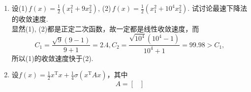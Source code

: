 \begin{enumerate}
\[\begin{array}{cc}
\begin{matrix}
        \end{matrix}
    \end{array}\right)\]
    牛顿法：由最速下降法知：$G$是正定的，且$\displaystyle G^{-1}=\left(\begin{array}{cc}
        \begin{matrix}
            0.5 & 0.5 \\ 0.5 & 1.5
        \end{matrix}
    \end{array}\right)$.\\
    迭代：$x^{(1)}=x^{(0)}-G(x^{(0)})^{-1} \nabla f(x^{(0)})=(1,1)^\mathrm{T}$,\\
    计算得：$\nabla f(x^{(1)})=(0,0)^\mathrm{T}$. 由最优性条件可知，迭代终止，得最优解：$x^*=x^{(1)}=(0,0)^\mathrm{T}$.\\
    若均各迭代一步，牛顿法选用带步长因子的，则解答如下：\\
    将$f(x)$写成$\displaystyle f(x) = \frac{1}{2}x^{\mathrm{T}}Gx-b^{\mathrm{T}}x$的形式，有
        \[G=\begin{pmatrix}
            3 & -1\\-1 & 1
        \end{pmatrix},b = \begin{pmatrix}
            2\\0
        \end{pmatrix}\]
        最速下降法：设$x^{(0)}=(-2,4)^{\mathrm{T}}$，则$g_0 = Gx^{(0)}-b=(-12,6)^{\mathrm{T}}$，$d_0 = -g_0 = (12,-6)^{\mathrm{T}}$，$\displaystyle\alpha_0 = -\frac{g_0^{\mathrm{T}}d_0}{d_0^{\mathrm{T}}Gd_0} = \frac{5}{17}$，$\displaystyle x^{(1)}=x^{(0)}+\alpha_0 d_0 = \left(\frac{26}{17},\frac{38}{17}\right)^{\mathrm{T}}$.\\
        牛顿法：设$x^{(0)}=(-2,4)^{\mathrm{T}}$，则$g_0 = Gx^{(0)}-b=(-12,6)^{\mathrm{T}}$，$d_0 = -G^{-1}g_0 = (3,-3)^{\mathrm{T}}$，$\displaystyle\alpha_0 = -\frac{g_0^{\mathrm{T}}d_0}{d_0^{\mathrm{T}}Gd_0} = 1$，$x^{(1)}=x^{(0)}+\alpha_0 d_0 = (1,1)^{\mathrm{T}}$，由于$G$是正定二次函数，一步迭代达到最优解，$(1,1)^{\mathrm{T}}$就是极小点.
    \item 设(1)\,$\displaystyle f(x)=\frac{1}{2}(x_1^2+9x_2^2)$, (2)\,$\displaystyle f(x)=\frac{1}{2}(x_1^2+10^4x_2^2)$. 试讨论最速下降法的收敛速度.\\
    \sol 显然(1), (2)都是正定二次函数，故一定都是线性收敛速度，而
    \[C_1 = \frac{\sqrt{9}(9-1)}{9+1} = 2.4, C_2 = \frac{\sqrt{10^4}(10^4 - 1)}{10^4 + 1} = 99.98 > C_1,\]
    所以(1)的收敛速度快于(2).
    \item 设$\displaystyle f(x)=\frac{1}{2}x^\mathrm{T}x+\frac{1}{4}\sigma(x^\mathrm{T}Ax)$，其中\[A=\begin{bmatrix}

\end{bmatrix}\]
\end{enumerate}
